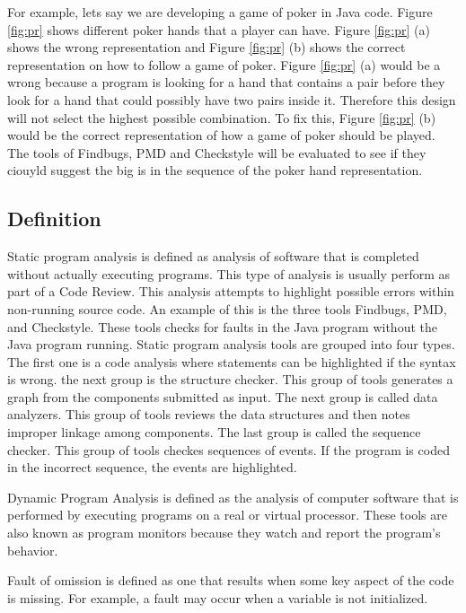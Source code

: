 \newpage

For example, lets say we are developing a game of poker in Java code. Figure \ref{fig:pr} shows different poker hands that a player can have. Figure \ref{fig:pr} (a) shows the wrong representation and Figure \ref{fig:pr} (b) shows the correct representation on how to follow a game of poker. Figure \ref{fig:pr} (a) would be a wrong because a program is looking for a hand that contains a pair before they look for a hand that could possibly have two pairs inside it. Therefore this design will not select the highest possible combination. To fix this, Figure \ref{fig:pr} (b) would be the correct representation of how a game of poker should be played. The tools of Findbugs, PMD and Checkstyle will be evaluated to see if they ciouyld suggest the big is in the sequence of the poker hand representation.

\subsection{Definition}


Static program analysis is defined as analysis of software that is completed without actually executing programs. This type of analysis is usually perform as part of a Code Review. This analysis attempts to highlight possible errors within non-running source code. An example of this is the three tools Findbugs, PMD, and Checkstyle. These tools checks for faults in the Java program without the Java program running. Static program analysis tools are grouped into four types. The first one is a code analysis where statements can be highlighted if the syntax is wrong. the next group is the structure checker. This group of tools generates a graph from the components submitted as input. The next group is called data analyzers. This group of tools reviews the data structures and then notes improper linkage among components. The last group is called the sequence checker. This group of tools checkes sequences of events. If the program is coded in the incorrect sequence, the events are highlighted.

Dynamic Program Analysis is defined as the analysis of computer software that is performed by executing programs on a real or virtual processor. These tools are also known as program monitors because they watch and report the program's behavior. 

Fault of omission is defined as one that results when some key aspect of the code is missing. For example, a fault may occur when a variable is not initialized.

